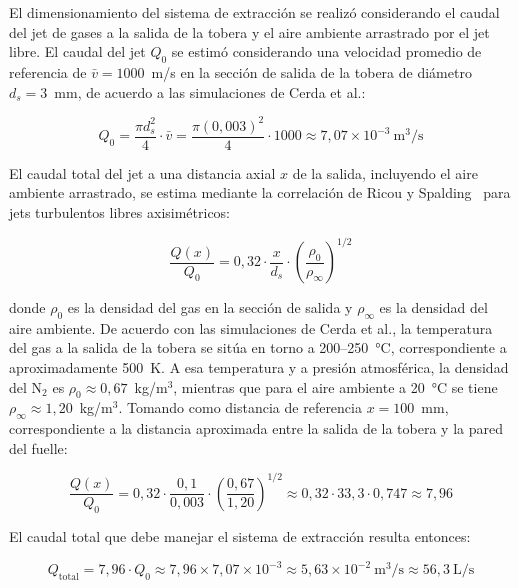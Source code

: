 El dimensionamiento del sistema de extracción se realizó considerando el caudal del jet de gases a la salida de la tobera y el aire ambiente arrastrado por el jet libre. El caudal del jet $Q_0$ se estimó considerando una velocidad promedio de referencia de $\bar{v} = 1000$~m/s en la sección de salida de la tobera de diámetro $d_s = 3$~mm, de acuerdo a las simulaciones de Cerda et al.:

\begin{equation}
	Q_0 = \frac{\pi d_s^2}{4} \cdot \bar{v} = \frac{\pi (0{,}003)^2}{4} \cdot 1000 \approx 7{,}07 \times 10^{-3}~\text{m}^3/\text{s}
	\label{eq:qjet}
\end{equation}

El caudal total del jet a una distancia axial $x$ de la salida, incluyendo el aire ambiente arrastrado, se estima mediante la correlación de Ricou y Spalding~\cite{RicouSpalding1961} para jets turbulentos libres axisimétricos:

\begin{equation}
	\frac{Q(x)}{Q_0} = 0{,}32 \cdot \frac{x}{d_s} \cdot \left(\frac{\rho_0}{\rho_\infty}\right)^{1/2}
	\label{eq:entrainment}
\end{equation}

donde $\rho_0$ es la densidad del gas en la sección de salida y $\rho_\infty$ es la densidad del aire ambiente. De acuerdo con las simulaciones de Cerda et al., la temperatura del gas a la salida de la tobera se sitúa en torno a 200–250~°C, correspondiente a aproximadamente 500~K. A esa temperatura y a presión atmosférica, la densidad del N$_2$ es $\rho_0 \approx 0{,}67$~kg/m$^3$, mientras que para el aire ambiente a 20~°C se tiene $\rho_\infty \approx 1{,}20$~kg/m$^3$. Tomando como distancia de referencia $x = 100$~mm, correspondiente a la distancia aproximada entre la salida de la tobera y la pared del fuelle:

\begin{equation}
	\frac{Q(x)}{Q_0} = 0{,}32 \cdot \frac{0{,}1}{0{,}003} \cdot \left(\frac{0{,}67}{1{,}20}\right)^{1/2} \approx 0{,}32 \cdot 33{,}3 \cdot 0{,}747 \approx 7{,}96
	\label{eq:ratio_entrainment}
\end{equation}

El caudal total que debe manejar el sistema de extracción resulta entonces:

\begin{equation}
	Q_\text{total} = 7{,}96 \cdot Q_0 \approx 7{,}96 \times 7{,}07 \times 10^{-3} \approx 5{,}63 \times 10^{-2}~\text{m}^3/\text{s} \approx 56{,}3~\text{L/s}
	\label{eq:qtotal}
\end{equation}


